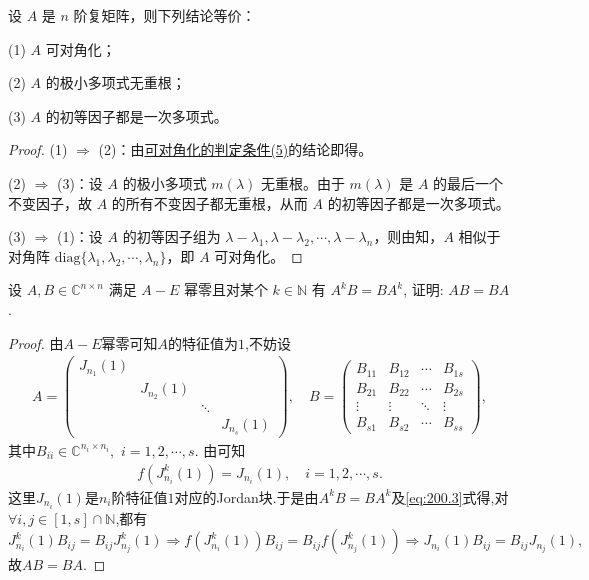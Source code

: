 \documentclass[../../main.tex]{subfiles}%
\begin{document}
\begin{corollary}
设 $A$ 是 $n$ 阶复矩阵，则下列结论等价：

(1) $A$ 可对角化；

(2) $A$ 的极小多项式无重根；

(3) $A$ 的初等因子都是一次多项式。
\end{corollary}
\begin{proof}

(1) $\Rightarrow$ (2)：由\hyperref[theorem:可对角化的判定条件]{可对角化的判定条件(5)}的结论即得。

(2) $\Rightarrow$ (3)：设 $A$ 的极小多项式 $m(\lambda)$ 无重根。由于 $m(\lambda)$ 是 $A$ 的最后一个不变因子，故 $A$ 的所有不变因子都无重根，从而 $A$ 的初等因子都是一次多项式。

(3) $\Rightarrow$ (1)：设 $A$ 的初等因子组为 $\lambda - \lambda_1,\lambda - \lambda_2,\cdots,\lambda - \lambda_n$，则由知，$A$ 相似于对角阵 $\mathrm{diag}\{\lambda_1,\lambda_2,\cdots,\lambda_n\}$，即 $A$ 可对角化。

\end{proof}

\begin{example}
设 \( A,B \in \mathbb{C}^{n \times n} \) 满足 \( A - E \) 幂零且对某个 \( k \in \mathbb{N} \) 有 \( A^k B = BA^k \), 证明: \( AB = BA \).
\end{example}
\begin{proof}

由$A-E$幂零可知$A$的特征值为$1$,不妨设
\begin{align*}
A=\begin{pmatrix}
J_{n_1}(1)&&&\\
&J_{n_2}(1)&&\\
&&\ddots&\\
&&&J_{n_s}(1)
\end{pmatrix},\quad B=\begin{pmatrix}
B_{11}&B_{12}&\cdots&B_{1s}\\
B_{21}&B_{22}&\cdots&B_{2s}\\
\vdots&\vdots&\ddots&\vdots\\
B_{s1}&B_{s2}&\cdots&B_{ss}
\end{pmatrix},
\end{align*}
其中$B_{ii}\in \mathbb{C} ^{n_i\times n_i},\,\,i=1,2,\cdots ,s.$
由可知
\begin{align}
f\left( J_{n_i}^{k}(1) \right) =J_{n_i}(1),\quad i=1,2,\cdots ,s.
\label{eq:200.3}
\end{align}
这里$J_{n_i}(1)$是$n_i$阶特征值$1$对应的Jordan块.于是由$A^kB=BA^k$及\eqref{eq:200.3}式得,对$\forall i,j\in [1,s] \cap \mathbb{N}$,都有
\[
J_{n_i}^{k}(1) B_{ij}=B_{ij}J_{n_j}^{k}(1) \Longrightarrow f\left( J_{n_i}^{k}(1) \right) B_{ij}=B_{ij}f\left( J_{n_j}^{k}(1) \right) \Longrightarrow J_{n_i}(1) B_{ij}=B_{ij}J_{n_j}(1),
\]
故$AB=BA$.

\end{proof}
\end{document}
